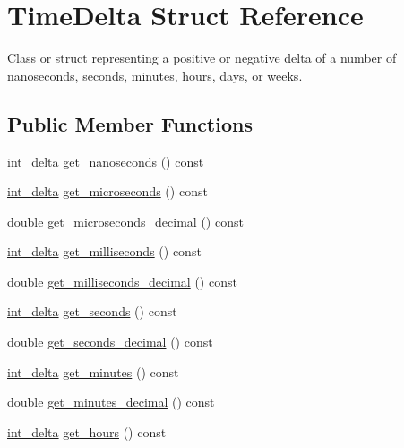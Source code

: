 \hypertarget{structTimeDelta}{\section{\-Time\-Delta \-Struct \-Reference}
\label{structTimeDelta}
}


\-Class or struct representing a positive or negative delta of a number of nanoseconds, seconds, minutes, hours, days, or weeks.  


\subsection*{\-Public \-Member \-Functions}
\begin{DoxyCompactItemize}
\item 
\hyperlink{types_8h_a8a67cf99971c5cfeeaa2380ba84a4c92}{int\-\_\-delta} \hyperlink{structTimeDelta_ac5f5521afb1b6118b34bf8987bd3b46f}{get\-\_\-nanoseconds} () const 
\item 
\hyperlink{types_8h_a8a67cf99971c5cfeeaa2380ba84a4c92}{int\-\_\-delta} \hyperlink{structTimeDelta_aea0305bf51cadc48b987ff97454201a0}{get\-\_\-microseconds} () const 
\item 
double \hyperlink{structTimeDelta_ad4563212afb3c7e4307a900ceac74995}{get\-\_\-microseconds\-\_\-decimal} () const 
\item 
\hyperlink{types_8h_a8a67cf99971c5cfeeaa2380ba84a4c92}{int\-\_\-delta} \hyperlink{structTimeDelta_a3cbd0c925ee1f8f0e028737643a830f6}{get\-\_\-milliseconds} () const 
\item 
double \hyperlink{structTimeDelta_ac7d647ea74d5b3abb8fdcfed1408d139}{get\-\_\-milliseconds\-\_\-decimal} () const 
\item 
\hyperlink{types_8h_a8a67cf99971c5cfeeaa2380ba84a4c92}{int\-\_\-delta} \hyperlink{structTimeDelta_a30cec240d3ae960182b5ad473f1f426c}{get\-\_\-seconds} () const 
\item 
double \hyperlink{structTimeDelta_a8d5ce7355977a739fe2330472bf50965}{get\-\_\-seconds\-\_\-decimal} () const 
\item 
\hyperlink{types_8h_a8a67cf99971c5cfeeaa2380ba84a4c92}{int\-\_\-delta} \hyperlink{structTimeDelta_a5f96f06d84489a75c4e52c76c682bd43}{get\-\_\-minutes} () const 
\item 
double \hyperlink{structTimeDelta_a9778c70f343b8238c30d72f79832ee68}{get\-\_\-minutes\-\_\-decimal} () const 
\item 
\hyperlink{types_8h_a8a67cf99971c5cfeeaa2380ba84a4c92}{int\-\_\-delta} \hyperlink{structTimeDelta_ad2e561054006c1a65a3e610eaf8e6e5e}{get\-\_\-hours} () const 

\end{DoxyCompactItemize}
